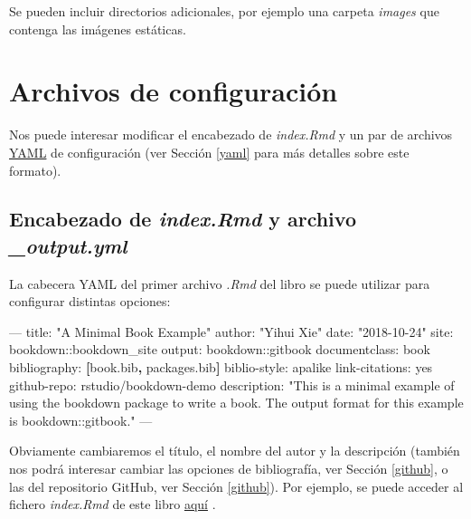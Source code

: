 \documentclass[]{book}
\newenvironment{Shaded}{\begin{snugshade}}{\end{snugshade}}
\newcommand{\KeywordTok}[1]{\textcolor[rgb]{0.13,0.29,0.53}{\textbf{#1}}}
\newcommand{\StringTok}[1]{\textcolor[rgb]{0.31,0.60,0.02}{#1}}
\newcommand{\OtherTok}[1]{\textcolor[rgb]{0.56,0.35,0.01}{#1}}
\newcommand{\FunctionTok}[1]{\textcolor[rgb]{0.00,0.00,0.00}{#1}}
\newcommand{\AttributeTok}[1]{\textcolor[rgb]{0.77,0.63,0.00}{#1}}
\newcommand{\NormalTok}[1]{#1}
\theoremstyle{definition}
\theoremstyle{definition}
\theoremstyle{definition}
\theoremstyle{remark}
\begin{document}
Se pueden incluir directorios adicionales, por ejemplo una carpeta
\emph{images} que contenga las imágenes estáticas.

\chapter{Archivos de configuración}\label{archivos-de-configuracion}

Nos puede interesar modificar el encabezado de \emph{index.Rmd} y un par
de archivos \href{https://en.wikipedia.org/wiki/YAML}{YAML} de
configuración (ver Sección \ref{yaml} para más detalles sobre este
formato).

\section{\texorpdfstring{Encabezado de \emph{index.Rmd} y archivo
\emph{\_output.yml}}{Encabezado de index.Rmd y archivo \_output.yml}}\label{encabezado-de-index.rmd-y-archivo-_output.yml}

La cabecera YAML del primer archivo \emph{.Rmd} del libro se puede
utilizar para configurar distintas opciones:

\begin{Shaded}
\begin{Highlighting}[]
\OtherTok{--- }
\FunctionTok{title:}\AttributeTok{ }\StringTok{"A Minimal Book Example"}
\FunctionTok{author:}\AttributeTok{ }\StringTok{"Yihui Xie"}
\FunctionTok{date:}\AttributeTok{ }\StringTok{"2018-10-24"}
\FunctionTok{site:}\AttributeTok{ bookdown::bookdown_site}
\FunctionTok{output:}\AttributeTok{ bookdown::gitbook}
\FunctionTok{documentclass:}\AttributeTok{ book}
\FunctionTok{bibliography:}\AttributeTok{ }\KeywordTok{[}\NormalTok{book.bib}\KeywordTok{,}\NormalTok{ packages.bib}\KeywordTok{]}
\FunctionTok{biblio-style:}\AttributeTok{ apalike}
\FunctionTok{link-citations:}\AttributeTok{ yes}
\FunctionTok{github-repo:}\AttributeTok{ rstudio/bookdown-demo}
\FunctionTok{description:}\AttributeTok{ }\StringTok{"This is a minimal example of using the bookdown package to write a book. The output format for this example is bookdown::gitbook."}
\OtherTok{---}
\end{Highlighting}
\end{Shaded}

Obviamente cambiaremos el título, el nombre del autor y la descripción
(también nos podrá interesar cambiar las opciones de bibliografía, ver
Sección \ref{github}, o las del repositorio GitHub, ver Sección
\ref{github}). Por ejemplo, se puede acceder al fichero \emph{index.Rmd}
de este libro
\href{https://github.com/rubenfcasal/bookdown_intro/raw/master/index.Rmd}{aquí}
.
\end{document}
